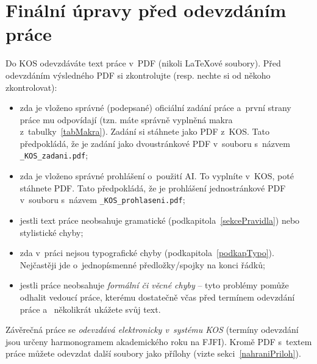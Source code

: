  
\section{Finální úpravy před odevzdáním práce}

Do KOS odevzdáváte text práce v~PDF (nikoli {\LaTeX}ové soubory). Před odevzdáním výsledného PDF si {\color{red}zkontrolujte} (resp. nechte si od někoho zkontrolovat):
\begin{itemize}
\item zda je vloženo správné (podepsané) oficiální zadání práce a~první strany práce mu odpovídají (tzn. máte správně vyplněná makra z~tabulky~\ref{tabMakra}). Zadání si stáhnete jako PDF z~KOS. Tato  předpokládá, že je zadání jako dvoustránkové PDF v~souboru s~názvem \texttt{\_KOS\_zadani.pdf};
\item zda je vloženo správné prohlášení 
o~použití AI. To vyplníte v~KOS, poté stáhnete PDF. Tato  předpokládá, že je prohlášení jednostránkové PDF v~souboru s~názvem \texttt{\_KOS\_prohlaseni.pdf};
\item jestli text práce neobsahuje gramatické (podkapitola~\ref{sekcePravidla}) nebo stylistické chyby;
\item zda v~práci nejsou typografické chyby (podkapitola~\ref{podkapTypo}). Nejčastěji jde o~jednopísmenné předložky/spojky na konci řádků;
\item jestli práce neobsahuje \textit{formální či věcné chyby} -- tyto problémy pomůže odhalit vedoucí práce, kterému {\color{red} dostatečně včas\/} před termínem odevzdání práce a~{\color{red} několikrát} ukážete svůj text.
\end{itemize}

Závěrečná práce se \textit{odevzdává elektronicky v~systému KOS} (termíny odevzdání jsou určeny harmonogramem akademického roku na FJFI). Kromě PDF s~textem práce můžete odevzdat další soubory jako přílohy (vizte sekci~\ref{nahraniPriloh}).
\par


